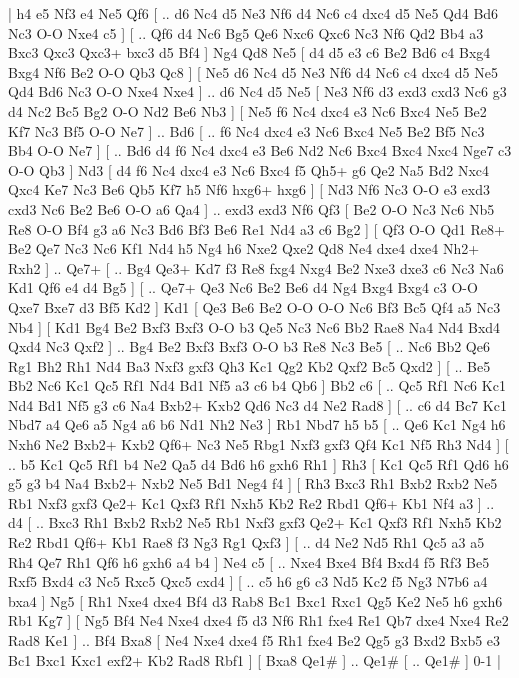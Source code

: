 \makegametitle 
|   h4   e5    Nf3   e4    Ne5   Qf6 [ .. d6  Nc4 d5  Ne3 Nf6  d4 Nc6  c4 dxc4  d5 Ne5  Qd4 Bd6  Nc3 O-O  Nxe4 c5   ]  [ .. Qf6  d4 Nc6  Bg5 Qe6  Nxc6 Qxc6  Nc3 Nf6  Qd2 Bb4  a3 Bxc3  Qxc3 Qxc3+  bxc3 d5  Bf4   ]  Ng4   Qd8    Ne5 [  d4 d5  e3 c6  Be2 Bd6  c4 Bxg4  Bxg4 Nf6  Be2 O-O  Qb3 Qc8   ]  [  Ne5 d6  Nc4 d5  Ne3 Nf6  d4 Nc6  c4 dxc4  d5 Ne5  Qd4 Bd6  Nc3 O-O  Nxe4 Nxe4   ] .. d6    Nc4   d5    Ne5 [  Ne3 Nf6  d3 exd3  cxd3 Nc6  g3 d4  Nc2 Bc5  Bg2 O-O  Nd2 Be6  Nb3   ]  [  Ne5 f6  Nc4 dxc4  e3 Nc6  Bxc4 Ne5  Be2 Kf7  Nc3 Bf5  O-O Ne7   ] .. Bd6 [ .. f6  Nc4 dxc4  e3 Nc6  Bxc4 Ne5  Be2 Bf5  Nc3 Bb4  O-O Ne7   ]  [ .. Bd6  d4 f6  Nc4 dxc4  e3 Be6  Nd2 Nc6  Bxc4 Bxc4  Nxc4 Nge7  c3 O-O  Qb3   ]  Nd3 [  d4 f6  Nc4 dxc4  e3 Nc6  Bxc4 f5  Qh5+ g6  Qe2 Na5  Bd2 Nxc4  Qxc4 Ke7  Nc3 Be6  Qb5 Kf7  h5 Nf6  hxg6+ hxg6   ]  [  Nd3 Nf6  Nc3 O-O  e3 exd3  cxd3 Nc6  Be2 Be6  O-O a6  Qa4   ] .. exd3    exd3   Nf6    Qf3 [  Be2 O-O  Nc3 Nc6  Nb5 Re8  O-O Bf4  g3 a6  Nc3 Bd6  Bf3 Be6  Re1 Nd4  a3 c6  Bg2   ]  [  Qf3 O-O  Qd1 Re8+  Be2 Qe7  Nc3 Nc6  Kf1 Nd4  h5 Ng4  h6 Nxe2  Qxe2 Qd8  Ne4 dxe4  dxe4 Nh2+  Rxh2   ] .. Qe7+ [ .. Bg4  Qe3+ Kd7  f3 Re8  fxg4 Nxg4  Be2 Nxe3  dxe3 c6  Nc3 Na6  Kd1 Qf6  e4 d4  Bg5   ]  [ .. Qe7+  Qe3 Nc6  Be2 Be6  d4 Ng4  Bxg4 Bxg4  c3 O-O  Qxe7 Bxe7  d3 Bf5  Kd2   ]  Kd1 [  Qe3 Be6  Be2 O-O  O-O Nc6  Bf3 Bc5  Qf4 a5  Nc3 Nb4   ]  [  Kd1 Bg4  Be2 Bxf3  Bxf3 O-O  b3 Qe5  Nc3 Nc6  Bb2 Rae8  Na4 Nd4  Bxd4 Qxd4  Nc3 Qxf2   ] .. Bg4    Be2   Bxf3    Bxf3   O-O    b3   Re8    Nc3   Be5 [ .. Nc6  Bb2 Qe6  Rg1 Bh2  Rh1 Nd4  Ba3 Nxf3  gxf3 Qh3  Kc1 Qg2  Kb2 Qxf2  Bc5 Qxd2   ]  [ .. Be5  Bb2 Nc6  Kc1 Qc5  Rf1 Nd4  Bd1 Nf5  a3 c6  b4 Qb6   ]  Bb2   c6 [ .. Qc5  Rf1 Nc6  Kc1 Nd4  Bd1 Nf5  g3 c6  Na4 Bxb2+  Kxb2 Qd6  Nc3 d4  Ne2 Rad8   ]  [ .. c6  d4 Bc7  Kc1 Nbd7  a4 Qe6  a5 Ng4  a6 b6  Nd1 Nh2  Ne3   ]  Rb1   Nbd7    h5   b5 [ .. Qe6  Kc1 Ng4  h6 Nxh6  Ne2 Bxb2+  Kxb2 Qf6+  Nc3 Ne5  Rbg1 Nxf3  gxf3 Qf4  Kc1 Nf5  Rh3 Nd4   ]  [ .. b5  Kc1 Qc5  Rf1 b4  Ne2 Qa5  d4 Bd6  h6 gxh6  Rh1   ]  Rh3 [  Kc1 Qc5  Rf1 Qd6  h6 g5  g3 b4  Na4 Bxb2+  Nxb2 Ne5  Bd1 Neg4  f4   ]  [  Rh3 Bxc3  Rh1 Bxb2  Rxb2 Ne5  Rb1 Nxf3  gxf3 Qe2+  Kc1 Qxf3  Rf1 Nxh5  Kb2 Re2  Rbd1 Qf6+  Kb1 Nf4  a3   ] .. d4 [ .. Bxc3  Rh1 Bxb2  Rxb2 Ne5  Rb1 Nxf3  gxf3 Qe2+  Kc1 Qxf3  Rf1 Nxh5  Kb2 Re2  Rbd1 Qf6+  Kb1 Rae8  f3 Ng3  Rg1 Qxf3   ]  [ .. d4  Ne2 Nd5  Rh1 Qc5  a3 a5  Rh4 Qe7  Rh1 Qf6  h6 gxh6  a4 b4   ]  Ne4   c5 [ .. Nxe4  Bxe4 Bf4  Bxd4 f5  Rf3 Be5  Rxf5 Bxd4  c3 Nc5  Rxc5 Qxc5  cxd4   ]  [ .. c5  h6 g6  c3 Nd5  Kc2 f5  Ng3 N7b6  a4 bxa4   ]  Ng5 [  Rh1 Nxe4  dxe4 Bf4  d3 Rab8  Bc1 Bxc1  Rxc1 Qg5  Ke2 Ne5  h6 gxh6  Rb1 Kg7   ]  [  Ng5 Bf4  Ne4 Nxe4  dxe4 f5  d3 Nf6  Rh1 fxe4  Re1 Qb7  dxe4 Nxe4  Re2 Rad8  Ke1   ] .. Bf4    Bxa8 [  Ne4 Nxe4  dxe4 f5  Rh1 fxe4  Be2 Qg5  g3 Bxd2  Bxb5 e3  Bc1 Bxc1  Kxc1 exf2+  Kb2 Rad8  Rbf1   ]  [  Bxa8 Qe1#   ] .. Qe1#    [ .. Qe1#   ] 0-1  |
